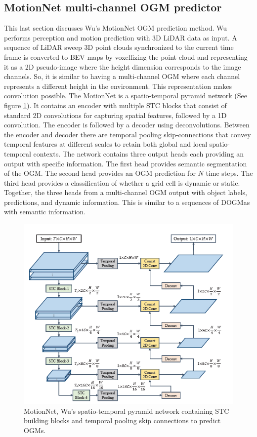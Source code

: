\subsection{MotionNet multi-channel \gls{OGM} predictor} \label{subsec:motionnet}
This last section discusses Wu's \cite{wu2020motionnet} MotionNet \gls{OGM} prediction method. Wu \cite{wu2020motionnet} performs perception and motion prediction with 3D LiDAR data as input. A sequence of LiDAR sweep 3D point clouds synchronized to the current time frame is converted to \gls{BEV} maps by voxellizing the point cloud and representing it as a 2D pseudo-image where the height dimension corresponds to the image channels. So, it is similar to having a multi-channel \gls{OGM} where each channel represents a different height in the environment. This representation makes convolution possible. The MotionNet is a spatio-temporal pyramid network (See figure \ref{fig:spatiotemporal}). It contains an encoder with multiple \gls{STC} blocks that consist of standard 2D convolutions for capturing spatial features, followed by a 1D convolution. The encoder is followed by a decoder using deconvolutions. Between the encoder and decoder there are temporal pooling skip-connections that convey temporal features at different scales to retain both global and local spatio-temporal contexts. The network contains three output heads each providing an output with specific information. The first head provides semantic segmentation of the \gls{OGM}. The second head provides an \gls{OGM} prediction for $N$ time steps. The third head provides a classification of whether a grid cell is dynamic or static. Together, the three heads from a multi-channel \gls{OGM} output with object labels, predictions, and dynamic information. This is similar to a sequences of \glspl{DOGMa} with semantic information. \\


\begin{figure}[h]
	\centering
	\includegraphics[width=0.6\linewidth]{Figures/Methods/STC_Block}
	\caption{MotionNet, Wu's \cite{wu2020motionnet} spatio-temporal pyramid network containing \gls{STC} building blocks and temporal pooling skip connections to predict \glspl{OGM}.}
	\label{fig:spatiotemporal}
\end{figure}

